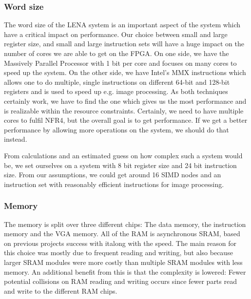 \subsubsection{Word size}

The word size of the LENA system is an important aspect of the system which
have a critical impact on performance. Our choice between small and large
register size, and
small and large instruction sets will have a huge impact on the number of cores
we are able to get on the FPGA. On one side, we have the Massively Parallel
Processor\cite{potter1985mpp} with 1 bit per core and focuses on many cores to
speed up the system. On the other side, we have Intel's MMX instructions which
allows one to do multiple, single instructions on different 64-bit and 128-bit
registers and is used to speed up e.g. image processing\cite{lee2004h264}. As
both techniques certainly work, we have to find the one which gives us the most
performance and is realizable within the resource constraints. Certainly, we
need to have multiple cores to fulfil NFR4, but the overall goal is to get
performance. If we get a better performance by allowing more operations on the
system, we should do that instead.

From calculations and an estimated guess
on how complex such a system would be, we set ourselves on a system with 8 bit register size and 24 bit instruction
size. From our assumptions, we could get around 16 SIMD nodes and an instruction
set with reasonably efficient instructions for image processing.

\subsubsection{Memory}

The memory is split over three different chips: The data memory, the instruction
memory and the VGA memory. All of the RAM is asynchronous SRAM, based on
previous projects success with it\cite{berg2011festinalente}along with the
speed. The main reason for this choice was mostly due to frequent reading and
writing, but also because larger SRAM modules were more costly than multiple
SRAM modules with less memory. An additional benefit from this is that the
complexity is lowered: Fewer potential collisions on RAM reading and writing
occurs since fewer parts read and write to the different RAM chips.

